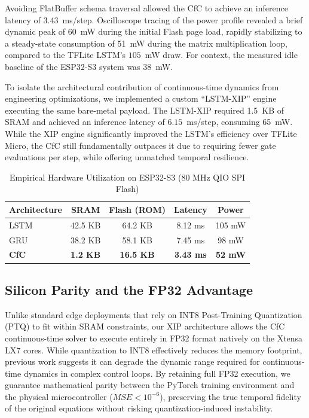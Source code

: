 \documentclass[conference]{IEEEtran}
\begin{document}
Avoiding FlatBuffer schema traversal allowed the CfC to achieve an inference latency of $3.43$~ms/step. Oscilloscope tracing of the power profile revealed a brief dynamic peak of 60~mW during the initial Flash page load, rapidly stabilizing to a steady-state consumption of 51~mW during the matrix multiplication loop, compared to the TFLite LSTM's $105$~mW draw. For context, the measured idle baseline of the ESP32-S3 system was $38$~mW. 

To isolate the architectural contribution of continuous-time dynamics from engineering optimizations, we implemented a custom ``LSTM-XIP'' engine executing the same bare-metal payload. The LSTM-XIP required 1.5~KB of SRAM and achieved an inference latency of $6.15$~ms/step, consuming 65~mW. While the XIP engine significantly improved the LSTM's efficiency over TFLite Micro, the CfC still fundamentally outpaces it due to requiring fewer gate evaluations per step, while offering unmatched temporal resilience.

\begin{table}[h]
\centering
\caption{Empirical Hardware Utilization on ESP32-S3 (80 MHz QIO SPI Flash)}
\label{tab:hardware}
\begin{tabular}{|l|c|c|c|c|}
\hline
\textbf{Architecture} & \textbf{SRAM} & \textbf{Flash (ROM)} & \textbf{Latency} & \textbf{Power} \\ \hline
LSTM   & 42.5 KB       & 64.2 KB              & 8.12 ms          & 105 mW         \\ \hline
GRU    & 38.2 KB       & 58.1 KB              & 7.45 ms          & 98 mW          \\ \hline
\textbf{CfC} & \textbf{1.2 KB} & \textbf{16.5 KB} & \textbf{3.43 ms} & \textbf{52 mW} \\ \hline
\end{tabular}
\end{table}

\subsection{Silicon Parity and the FP32 Advantage}
Unlike standard edge deployments that rely on INT8 Post-Training Quantization (PTQ) to fit within SRAM constraints, our XIP architecture allows the CfC continuous-time solver to execute entirely in FP32 format natively on the Xtensa LX7 cores. While quantization to INT8 effectively reduces the memory footprint, previous work suggests it can degrade the dynamic range required for continuous-time dynamics in complex control loops. By retaining full FP32 execution, we guarantee mathematical parity between the PyTorch training environment and the physical microcontroller ($MSE < 10^{-6}$), preserving the true temporal fidelity of the original equations without risking quantization-induced instability.
\end{document}
